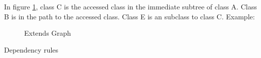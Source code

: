 \documentclass{cslthse-msc}
\begin{document}
In figure \ref{fig:extends}, class C is the accessed class in the immediate subtree of class A. Class B is in the path to the accessed class. Class E is an subclass to class C.
Example:
\begin{figure}[H]
    \centering
    	\qquad
    	\subfloat{\raisebox{4.5 cm}{}}
    \caption{Extends Graph}
    \label{fig:extends}
\end{figure}
Dependency rules
\end{document}
